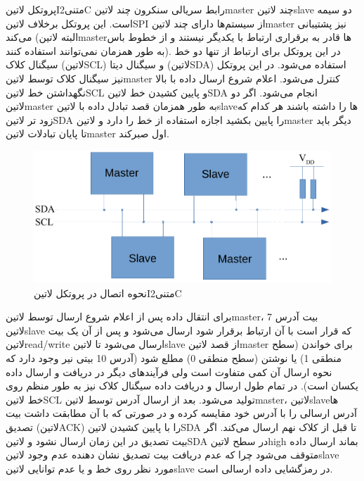 پروتکل ‌لاتین{I‌متنی{2}C} رابط سریالی سنکرون چند ‌لاتین{master} چند ‌لاتین{slave} دو سیمه است. این پروتکل برخلاف ‌لاتین{SPI} از سیستم‌ها دارای چند ‌لاتین{master} نیز پشتیبانی می‌کند (البته ‌لاتین{master}ها قادر به برقراری ارتباط با یکدیگر نیستند و از خطوط باس به طور همزمان نمی‌توانند استفاده کنند). در این پروتکل برای ارتباط از تنها دو خط سیگنال کلاک (‌لاتین{SCL}) و سیگنال دیتا (‌لاتین{SDA}) استفاده می‌شود. در این پروتکل نیز سیگنال کلاک توسط ‌لاتین{master} کنترل می‌شود. اعلام شروع ارسال داده با بالا نگهداشتن خط ‌لاتین{SCL} و پایین کشیدن خط ‌لاتین{SDA} انجام می‌شود. اگر دو ‌لاتین{master} به طور همزمان قصد تبادل داده با ‌لاتین{slave}ها را داشته باشند هر کدام که زود تر ‌لاتین{SDA} را پایین بکشید اجازه استفاده از خط را دارد و ‌لاتین{master} دیگر باید تا پایان تبادلات ‌لاتین{master} اول صبرکند.

\begin{figure}[!h]
	\centering
	\includegraphics[width=.7\linewidth]{Assets/I2C.pdf}
	\caption{نحوه اتصال در پروتکل ‌لاتین{{I‌متنی{2}C}}}
	\label{fig:I2CWiring}
\end{figure}

برای انتقال داده پس از اعلام شروع ارسال توسط ‌لاتین{master}، 7 بیت آدرس ‌لاتین{slave} که قرار است با آن ارتباط برقرار شود ارسال می‌شود و پس از آن یک بیت ‌لاتین{read/write} ارسال می‌شود تا ‌لاتین{slave} از قصد ‌لاتین{master} برای خواندن (سطح منطقی 1) یا نوشتن (سطح منطقی 0) مطلع شود (آدرس 10 بیتی نیر وجود دارد که نحوه ارسال آن کمی متفاوت است ولی فرآیند‌های دیگر در دریافت و ارسال داده یکسان است). در تمام طول ارسال و دریافت داده سیگنال کلاک نیز به طور منظم روی خط ‌لاتین{SCL} تولید می‌شود. بعد از ارسال آدرس توسط ‌لاتین{master}، ‌لاتین{slave}ها آدرس ارسالی را با آدرس خود مقایسه کرده و در صورتی که با آن مطابقت داشت بیت تصدیق (‌لاتین{ACK}) را با پایین کشیدن ‌لاتین{SDA} تا قبل از کلاک نهم ارسال می‌کند. اگر بیت تصدیق در این زمان ارسال نشود و ‌لاتین{SDA} در سطح ‌لاتین{high} بماند ارسال داده متوقف می‌شود چرا که عدم دریافت بیت تصدیق نشان دهنده عدم وجود ‌لاتین{slave} مورد نظر روی خط و یا عدم توانایی ‌لاتین{slave} در رمزگشایی داده ارسالی است. 

